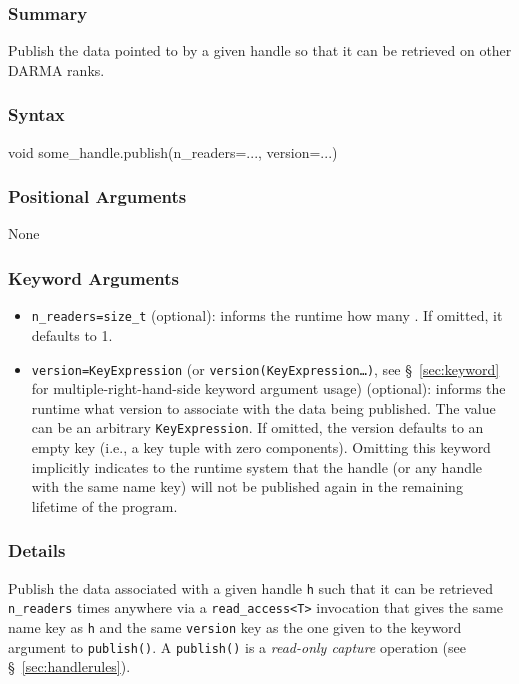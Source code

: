 \hspace{0.1cm} %
\begin{subs}
\vspace{-1.2cm}

\subsubsection{Summary} 
Publish the data pointed to by a given handle so that it can be retrieved on 
other DARMA ranks.

\subsubsection{Syntax} 
\begin{CppCode}
void some_handle.publish(n_readers=..., version=...)
\end{CppCode}

\subsubsection{Positional Arguments} 
None

\subsubsection{Keyword Arguments} 
\begin{itemize}
\item \texttt{n\_readers=size\_t} (optional): informs the runtime how many . If
omitted, it defaults to 1.
\item \texttt{version=KeyExpression} (or \texttt{version(KeyExpression\ldots)},
see \S~\ref{sec:keyword} for multiple-right-hand-side keyword argument usage)
(optional):
informs the runtime what version to associate with the data being published. 
The value can be an arbitrary \texttt{KeyExpression}.
If omitted, the version defaults to an empty key (i.e., a key tuple with zero 
components).  Omitting this keyword implicitly indicates to the runtime system
that the handle (or any handle with the same name key) will not be published
again in the remaining lifetime of the program.
\end{itemize}

\subsubsection{Details} 

Publish the data associated with a given handle \texttt{h} such that it can be
retrieved \texttt{n\_readers} times anywhere via a \texttt{read\_access<T>} invocation
that gives the same name key as \texttt{h} and the same \texttt{version} key as
the one given to the keyword argument to \texttt{publish()}.
A \texttt{publish()} is a {\it read-only capture} operation (see
\S~\ref{sec:handlerules}).


\end{subs}
